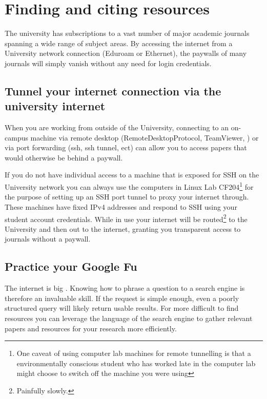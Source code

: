 \chapter{Finding and citing resources}
	\label{chap:resources}
		
The university has subscriptions to a vast number of major academic journals spanning a wide range of subject areas.
By accessing the internet from a University network connection (Eduroam or Ethernet), the paywalls of many journals will simply vanish without any need for login credentials.


	\section{Tunnel your internet connection via the university internet}

When you are working from outside of the University, connecting to an on-campus machine via remote desktop (RemoteDesktopProtocol, TeamViewer, \etc) or via port forwarding (ssh, ssh tunnel, ect) can allow you to access papers that would otherwise be behind a paywall. 
		
If you do not have individual access to a machine that is exposed for SSH on the University network you can always use the computers in Linux Lab CF204\footnote{One caveat of using computer lab machines for remote tunnelling is that a environmentally conscious student who has worked late in the computer lab might choose to switch off the machine you were using\edots} for the purpose of setting up an SSH port tunnel to proxy your internet through.
These machines have fixed IPv4 addresses and respond to SSH using your student account credentials.
While in use your internet will be routed\footnote{Painfully slowly.} to the University and then out to the internet, granting you transparent access to journals without a paywall.


	\section{Practice your Google Fu}
		\label{sec:google_fu}

The internet is big \cite{sizeofinternet}.
Knowing how to phrase a question to a search engine is therefore an invaluable skill.
If the request is simple enough, even a poorly structured query will likely return usable results.
For more difficult to find resources you can leverage the language of the search engine to gather relevant papers and resources for your research more efficiently. 
		
